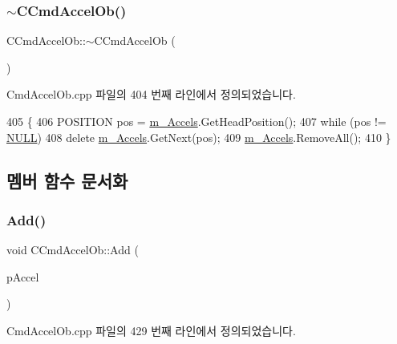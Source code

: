 \subsubsection{\texorpdfstring{$\sim$\+C\+Cmd\+Accel\+Ob()}{~CCmdAccelOb()}}
{\footnotesize\ttfamily C\+Cmd\+Accel\+Ob\+::$\sim$\+C\+Cmd\+Accel\+Ob (\begin{DoxyParamCaption}{ }\end{DoxyParamCaption})}



Cmd\+Accel\+Ob.\+cpp 파일의 404 번째 라인에서 정의되었습니다.


\begin{DoxyCode}
405 \{
406   POSITION pos = \mbox{\hyperlink{class_c_cmd_accel_ob_a85772f1ea9204af42b8a39a0135dc0f8}{m\_Accels}}.GetHeadPosition();
407   \textcolor{keywordflow}{while} (pos != \mbox{\hyperlink{getopt1_8c_a070d2ce7b6bb7e5c05602aa8c308d0c4}{NULL}})
408     \textcolor{keyword}{delete} \mbox{\hyperlink{class_c_cmd_accel_ob_a85772f1ea9204af42b8a39a0135dc0f8}{m\_Accels}}.GetNext(pos);
409   \mbox{\hyperlink{class_c_cmd_accel_ob_a85772f1ea9204af42b8a39a0135dc0f8}{m\_Accels}}.RemoveAll();
410 \}
\end{DoxyCode}


\subsection{멤버 함수 문서화}
\mbox{\label{class_c_cmd_accel_ob_a519f8c7ac935b0d06531589e5427b656}} 
\subsubsection{\texorpdfstring{Add()}{Add()}\hspace{0.1cm}{\footnotesize\ttfamily [1/2]}}
{\footnotesize\ttfamily void C\+Cmd\+Accel\+Ob\+::\+Add (\begin{DoxyParamCaption}\item[{\mbox{\hyperlink{class_c_accels_ob}{C\+Accels\+Ob}} $\ast$}]{p\+Accel }\end{DoxyParamCaption})}



Cmd\+Accel\+Ob.\+cpp 파일의 429 번째 라인에서 정의되었습니다.


